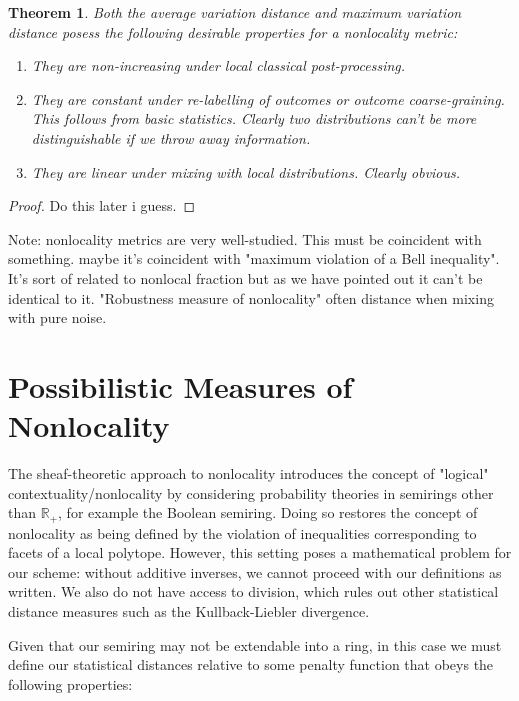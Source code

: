 \documentclass{amsart}
\newtheorem{thm}{Theorem}
\theoremstyle{definition}
\begin{document}
\begin{thm}
Both the average variation distance and maximum variation distance posess the following desirable properties for a nonlocality metric:
\begin{enumerate} 
\item They are non-increasing under local classical post-processing.
\item They are constant under re-labelling of outcomes or outcome coarse-graining. This follows from basic statistics. Clearly two distributions can't be more distinguishable if we throw away information.
\item They are linear under mixing with local distributions. Clearly obvious.
\end{enumerate}
\end{thm}

\begin{proof}
Do this later i guess.

\end{proof}

Note: nonlocality metrics are very well-studied. This must be coincident with something. maybe it's coincident with "maximum violation of a Bell inequality". It's sort of related to nonlocal fraction but as we have pointed out it can't be identical to it. "Robustness measure of nonlocality" often distance when mixing with pure noise.

\section{Possibilistic Measures of Nonlocality}

The sheaf-theoretic approach to nonlocality introduces the concept of "logical" contextuality/nonlocality by considering probability theories in semirings other than $\mathbb{R}_+$, for example the Boolean semiring. Doing so restores the concept of nonlocality as being defined by the violation of inequalities corresponding to facets of a local polytope. However, this setting poses a mathematical problem for our scheme: without additive inverses, we cannot proceed with our definitions as written. We also do not have access to division, which rules out other statistical distance measures such as the Kullback-Liebler divergence.

Given that our semiring may not be extendable into a ring, in this case we must define our statistical distances relative to some penalty function that obeys the following properties:
\end{document}
